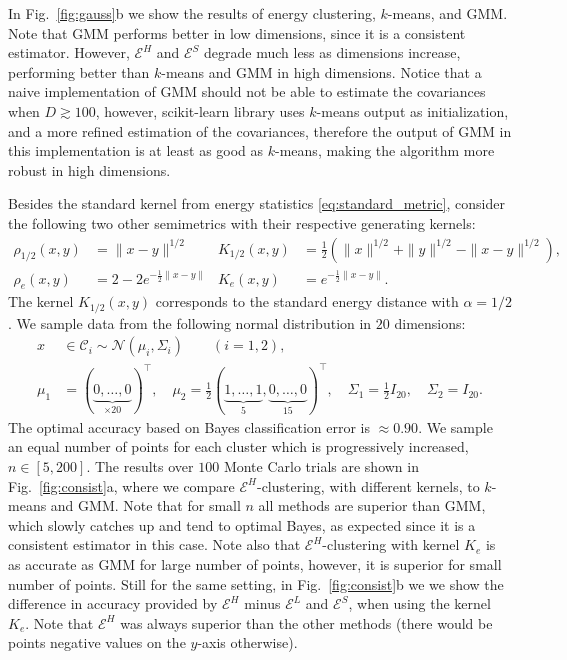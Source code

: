 \documentclass[aps,preprint,nofootinbib,floatfix]{revtex4-1}
\newcommand\kk{K}
\newcommand\C{{\mathcal{C}}}
\begin{document}
In Fig.~\ref{fig:gauss}b we show the results of energy clustering,
$k$-means, and GMM.
Note that GMM performs better in low dimensions, 
since it is a consistent estimator.
However, $\mathcal{E}^H$ and $\mathcal{E}^S$ degrade much less as dimensions
increase, performing better than $k$-means and GMM in high dimensions.
Notice that a naive implementation of GMM should not be able to 
estimate the covariances when $D \gtrsim 100$, however, scikit-learn library
uses $k$-means output as initialization, and a more refined estimation
of the covariances, therefore the
output of GMM in this implementation is at least as good as $k$-means, making
the algorithm more robust in high dimensions.
 
Besides the standard kernel from energy statistics 
\eqref{eq:standard_metric}, 
consider the following two other semimetrics with their respective generating
kernels:
\begin{align}
\rho_{1/2}(x,y) &= \| x-y \|^{1/2} & 
 \kk_{1/2}(x,y) &= \tfrac{1}{2} \left( 
\| x \|^{1/2} + \| y \|^{1/2} 
- \| x-y \|^{1/2} \right), \label{eq:rhohalf}\\
\rho_{e}(x,y) &= 
2 - 2 e^{-\tfrac{1}{2}\| x- y\|} &
 \kk_{e}(x,y) &= e^{-\tfrac{1}{2}\| x-y\|}.
\label{eq:rhoe}
\end{align}
The kernel $K_{1/2}(x,y)$ corresponds to the standard energy distance
with $\alpha=1/2$.
We sample data from the following normal distribution in $20$ dimensions:
\begin{equation}
\label{eq:20gauss}
\begin{split}
x &\in \C_i \sim \mathcal{N}(\mu_i,\Sigma_i) \qquad (i=1,2), \\
\mu_1 &= (\underbrace{0,\dotsc,0}_{\times 20})^\top ,\quad
\mu_2 = \tfrac{1}{2} 
(\underbrace{1,\dotsc,1}_{5},\underbrace{0,\dotsc,0}_{15})^\top, \quad
\Sigma_1 = \tfrac{1}{2} I_{20},  \quad
\Sigma_2 = I_{20}.
\end{split}
\end{equation}
The optimal accuracy based on Bayes
classification error is $\approx 0.90$. 
We sample an equal number of points for each cluster which is progressively
increased, $n \in [5, 200]$. 
The results over $100$ Monte Carlo trials are 
shown in Fig.~\ref{fig:consist}a, where we compare
$\mathcal{E}^H$-clustering, with different
kernels, to $k$-means and GMM.
Note that for small $n$ all methods
are superior than GMM, which slowly catches up and tend to optimal Bayes,
as expected since it is a consistent estimator in this case. 
Note also that $\mathcal{E}^H$-clustering
with kernel $\kk_e$ is as accurate as GMM for large number of points, however,
it is superior for small number of points. Still for
the same setting, in Fig.~\ref{fig:consist}b we
we show the difference in accuracy provided by $\mathcal{E}^H$ minus
$\mathcal{E}^L$ and $\mathcal{E}^S$, when using the
kernel $\kk_e$.
Note that $\mathcal{E}^H$ was
always superior than the other 
methods (there would be points negative values on the $y$-axis otherwise).
\end{document}
